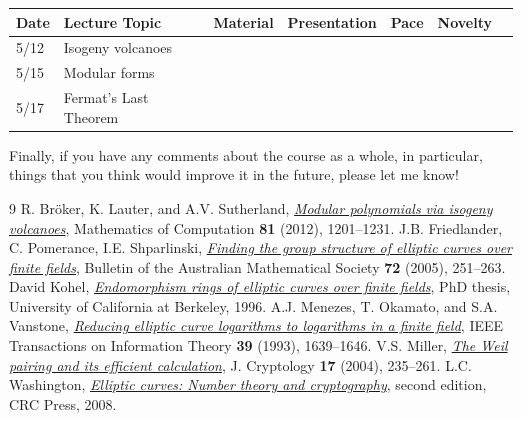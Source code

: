 \documentclass[11pt]{article}
\theoremstyle{definition}
\begin{document}
\begin{center}
\begin{tabular}{l|l|r|r|r|r|r}
Date & Lecture Topic & Material & Presentation & Pace & Novelty\\\hline
5/12 & Isogeny volcanoes & & & & \\\hline 
5/15 & Modular forms & & & & \\\hline 
5/17 & Fermat's Last Theorem & & & & \\\hline 
\end{tabular}
\end{center}

\noindent
Finally, if you have any comments about the course as a whole, in particular, things that you think would improve it in the future, please let me know!

\begin{thebibliography}{9}
 R. Br\"oker,  K. Lauter, and A.V. Sutherland, \href{http://www.ams.org/journals/mcom/2012-81-278/S0025-5718-2011-02508-1/}{\textit{Modular polynomials via isogeny volcanoes}}, Mathematics of Computation \textbf{81} (2012), 1201--1231.
 J.B. Friedlander, C. Pomerance, I.E. Shparlinski, \href{https://doi.org/10.1017/S0004972700035048}{\textit{Finding the group structure of elliptic curves over finite fields}}, Bulletin of the Australian Mathematical Society \textbf{72} (2005), 251--263.
 David Kohel, \href{http://iml.univ-mrs.fr/~kohel/pub/thesis.pdf}{\textit{Endomorphism rings of elliptic curves over finite fields}}, PhD thesis, University of California at Berkeley, 1996.
 A.J. Menezes, T. Okamato, and S.A. Vanstone, \href{https://doi.org/10.1145/103418.103434}{\textit{Reducing elliptic curve logarithms to logarithms in a finite field}}, IEEE Transactions on Information Theory \textbf{39} (1993), 1639--1646.
 V.S. Miller, \href{http://link.springer.com/article/10.1007/s00145-004-0315-8}{\textit{The Weil pairing and its efficient calculation}}, J. Cryptology \textbf{17} (2004), 235--261.
 L.C. Washington, \href{https://doi.org/10.1201/9781420071474}{\textit{Elliptic curves: Number theory and cryptography}}, second edition, CRC Press, 2008.
\end{thebibliography}
\end{document}
